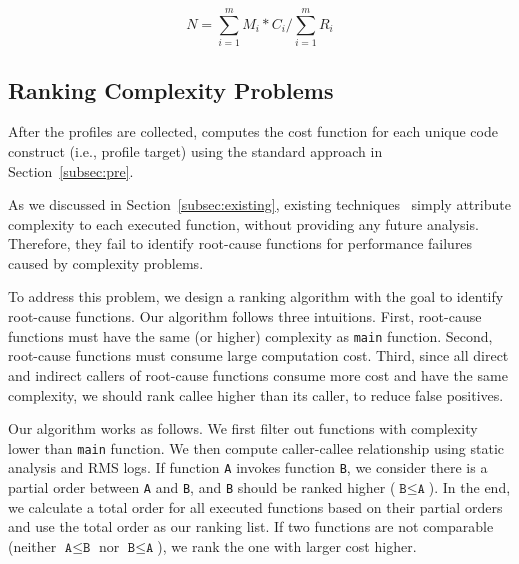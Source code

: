 \begin{equation} \label{eq:mark}
N = \sum\limits_{i=1}^m M_i*C_i\Big/\sum\limits_{i=1}^m R_i
\end{equation}

\subsection{Ranking Complexity Problems}

After the profiles are collected, \Tool computes
the cost function for each unique code construct
(i.e., profile target) using the standard approach
in Section~\ref{subsec:pre}. 
 
As we discussed in Section~\ref{subsec:existing}, 
existing techniques~\cite{Aprof1,Aprof2,AlgoProf} 
simply attribute complexity to each executed function, 
without providing any future analysis. 
Therefore, they fail to identify root-cause functions for 
performance failures caused by complexity problems. 

To address this problem, we design a ranking algorithm 
with the goal to identify root-cause functions. 
Our algorithm follows three intuitions. 
First, root-cause functions must have the same (or higher) 
complexity as \texttt{main} function.
Second, root-cause functions must consume large computation cost.
Third, since all direct and indirect callers of root-cause functions 
consume more cost and have the same complexity, 
we should rank callee higher than its caller, 
to reduce false positives. 

Our algorithm works as follows. 
We first filter out functions with complexity lower than \texttt{main} function.
We then compute caller-callee relationship using static analysis and RMS logs. 
If function \texttt{A} invokes function \texttt{B}, 
we consider there is a partial order between \texttt{A} and \texttt{B},
and \texttt{B} should be ranked higher ($\texttt{B} \leq \texttt{A}$). 
In the end, we calculate a total order for all executed functions based 
on their partial orders and use the total order as our ranking list. 
If two functions are not comparable 
(neither $\texttt{A} \leq \texttt{B}$ nor $\texttt{B} \leq \texttt{A}$), 
we rank the one with larger cost higher. 

